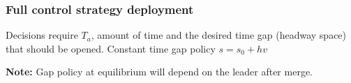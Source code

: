 
\begin{frame}
    \frametitle{Full control strategy deployment}
    Decisions require \(T_a\), amount of time and the desired time gap (headway space) that should be opened. 
    Constant time gap policy \(s = s_0 + h v\)
    \vspace{0.5cm}
    \begin{center}
    \end{center}
    \vspace{-1cm}
    \textbf{Note:} Gap policy at equilibrium will depend on the leader after merge.
  \end{frame}